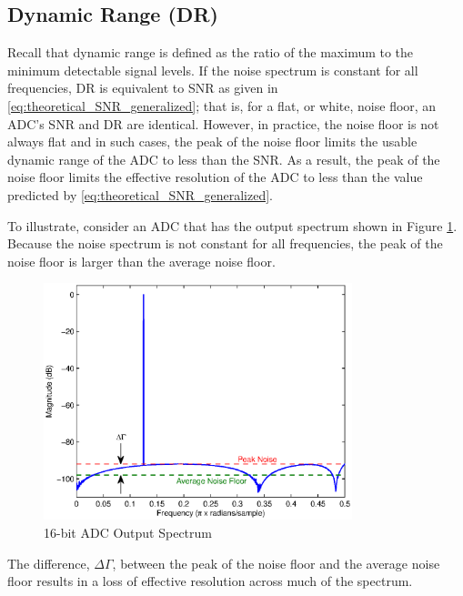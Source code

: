 \subsection{Dynamic Range (DR)}
Recall that dynamic range is defined as the ratio of the maximum to the minimum detectable
signal levels. If the noise spectrum is constant for all frequencies, DR is equivalent to
SNR as given in \eqref{eq:theoretical_SNR_generalized}; that is, for a flat, or white,
noise floor, an ADC's SNR and DR are identical. However, in practice, the noise floor
is not always flat and in such cases, the peak of the noise floor limits the usable
dynamic range of the ADC to less than the SNR. As a result, the peak of the noise floor
limits the effective resolution of the ADC to less than the value predicted by
\eqref{eq:theoretical_SNR_generalized}.

To illustrate, consider an ADC that has the output spectrum shown in Figure
\ref{fig:DR_SNR_spectrum}. Because the noise spectrum is not constant for all
frequencies, the peak of the noise floor is larger than the average noise floor. 
\begin{figure}[htbp]
 \centering
 \includegraphics[width=0.8\textwidth]{./matlab_figures/DR_SNR_spectrum}
 \caption{16-bit ADC Output Spectrum}
 \label{fig:DR_SNR_spectrum}
\end{figure}
The difference, $\Delta\Gamma$, between the peak of the noise floor and the average noise
floor results in a loss of effective resolution across much of the spectrum.

